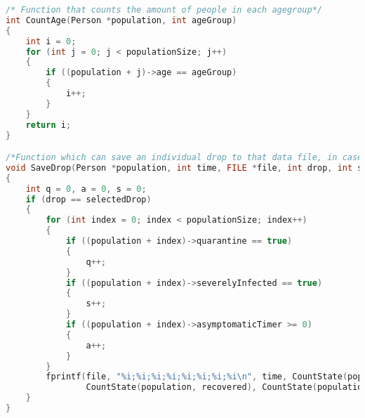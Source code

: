 \begin{lstlisting}[language=c, caption={Our simulations written in c}, captionpos=b, label={snippet:LABELNAVN}]
/* Function that counts the amount of people in each agegroup*/
int CountAge(Person *population, int ageGroup)
{
    int i = 0;
    for (int j = 0; j < populationSize; j++)
    {
        if ((population + j)->age == ageGroup)
        {
            i++;
        }
    }
    return i;
}

/*Function which can save an individual drop to that data file, in case further analysis of a specific drop is neccesary*/
void SaveDrop(Person *population, int time, FILE *file, int drop, int selectedDrop)
{
    int q = 0, a = 0, s = 0;
    if (drop == selectedDrop)
    {
        for (int index = 0; index < populationSize; index++)
        {
            if ((population + index)->quarantine == true)
            {
                q++;
            }
            if ((population + index)->severelyInfected == true)
            {
                s++;
            }
            if ((population + index)->asymptomaticTimer >= 0)
            {
                a++;
            }
        }
        fprintf(file, "%i;%i;%i;%i;%i;%i;%i;%i\n", time, CountState(population, susceptible), CountState(population, infected),
                CountState(population, recovered), CountState(population, deceased), s, q, a);
    }
}
\end{lstlisting}